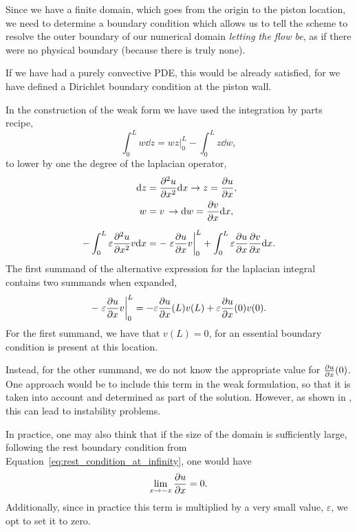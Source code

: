 \documentclass[../../thesis.tex]{subfiles}
\begin{document}
Since we have a finite domain, which goes from the origin to the piston location,
we need to determine a boundary condition which allows us 
to tell the scheme to resolve the outer boundary of our numerical domain
\textit{letting the flow be}, 
as if there were no physical boundary (because there is truly none).

If we have had a purely convective PDE, this would be already satisfied, 
for we have defined a Dirichlet boundary condition at the piston wall.

In the construction of the weak form
we have used the integration by parts recipe,
\begin{equation}
    \int_{0}^{L} w \dd z 
    = \left.wz\right|_{0}^{L} - \int_{0}^{L} z \dd w,
\end{equation}
to lower by one the degree of the laplacian operator,
\begin{subequations}
    \begin{align}
        \dd z &= \pdv[2]{u}{x} \dd x \rightarrow z = \pdv{u}{x},
        \\
        w &= v \, \rightarrow \dd w = \pdv{v}{x} \dd x,
        \\[2mm]
        -\int_{0}^{L} 
        \varepsilon \pdv[2]{u}{x} v \dd x 
        &= -\left.\varepsilon \pdv{u}{x} v \right|_{0}^{L} 
        + \int_{0}^{L} \varepsilon \pdv{u}{x} \pdv{v}{x} \dd x.
    \end{align}
\end{subequations}
The first summand of the alternative expression for the laplacian integral 
contains two summands when expanded,
\begin{equation}
    -\left.\varepsilon \pdv{u}{x} v \right|_{0}^{L}
    = 
    -\varepsilon\pdv{u}{x} \qty(L) v(L) 
    +\varepsilon\pdv{u}{x} \qty(0) v(0).
\end{equation}
For the first summand, we have that $v(L) = 0$, 
for an essential boundary condition is present at this location.

Instead, for the other summand, we do not know the appropriate value for 
$\pdv{u}{x} \qty(0)$.
One approach would be to include this term in the weak formulation, so that it is taken into account and determined as part of the solution.
However, as shown in \cite{outerBoundary}, this can lead to instability problems.

In practice, one may also think that if the size of the domain is sufficiently large,
following the rest boundary condition from Equation~\eqref{eq:rest_condition_at_infinity},
one would have
\begin{equation}
    \lim_{x\rightarrow -x} \pdv{u}{x} = 0.
\end{equation}
Additionally, since in practice this term is multiplied by a very small value, 
$\varepsilon$, 
we opt to set it to zero.
\end{document}
